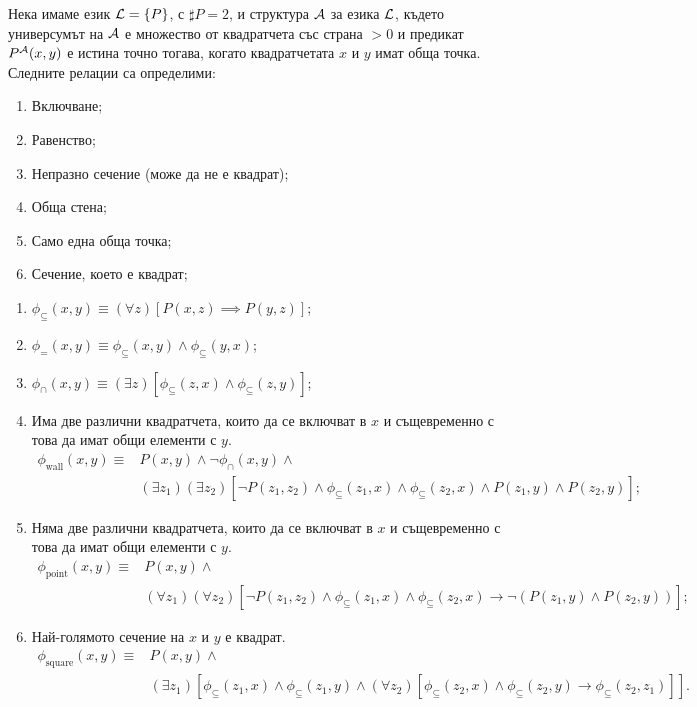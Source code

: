 \begin{problem}
  Нека имаме език $\mathcal{L} = \{P\}$, с $\sharp P = 2$, и структура $\mathcal{A}$ за езика $\mathcal{L}$, където
  универсумът на $\mathcal{A}$ е множество от квадратчета със страна $> 0$ и предикат $P^{\mathcal{A}}(x,y)$ е истина точно тогава, когато квадратчетата $x$ и $y$ имат обща точка.
  Следните релации са определими:
  \begin{enumerate}[1)]
  \item
    Включване;
  \item
    Равенство;
  \item
    Непразно сечение (може да не е квадрат);
  \item
    Обща стена;
  \item
    Само една обща точка;
  \item
    Сечение, което е квадрат;
  \end{enumerate}
\end{problem}
\begin{solution}
  \begin{enumerate}[1)]
  \item
    $\phi_{\subseteq}(x,y) \equiv (\forall z)[P(x,z) \implies P(y,z)]$;
  \item
    $\phi_{=}(x,y) \equiv \phi_{\subseteq}(x,y) \land \phi_{\subseteq}(y,x)$;
  \item
    $\phi_{\cap}(x,y) \equiv (\exists z)[\phi_{\subseteq}(z,x) \land \phi_{\subseteq}(z,y)]$;
  \item
    Има две различни квадратчета, които да се включват в $x$ и същевременно с това да имат общи елементи с $y$.
    \begin{align*}
      \phi_{\text{wall}}(x,y) \equiv &  P(x,y) \land \neg \phi_{\cap}(x,y) \land\\
                                 & (\exists z_1)(\exists z_2)[\neg P(z_1,z_2) \land \phi_{\subseteq}(z_1,x) \land \phi_{\subseteq}(z_2,x) \land P(z_1,y)\land P(z_2,y)];
    \end{align*}
  \item
    Няма две различни квадратчета, които да се включват в $x$ и същевременно с това да имат общи елементи с $y$.
    \begin{align*}
      \phi_{\text{point}}(x,y) \equiv &  P(x,y) \land\\
                                      & (\forall z_1)(\forall z_2)[\neg P(z_1,z_2) \land \phi_{\subseteq}(z_1,x) \land \phi_{\subseteq}(z_2,x) \to \neg(P(z_1,y)\land P(z_2,y))];
    \end{align*}
  \item
    Най-голямото сечение на $x$ и $y$ е квадрат.
    \begin{align*}
      \phi_{\text{square}}(x,y) \equiv & P(x,y) \land \\
                                       & (\exists z_1)[\phi_{\subseteq}(z_1,x) \land \phi_{\subseteq}(z_1,y) \land (\forall z_2)[\phi_{\subseteq}(z_2,x) \land \phi_{\subseteq}(z_2,y) \to \phi_{\subseteq}(z_2,z_1)]].
    \end{align*}
  \end{enumerate}
\end{solution}

